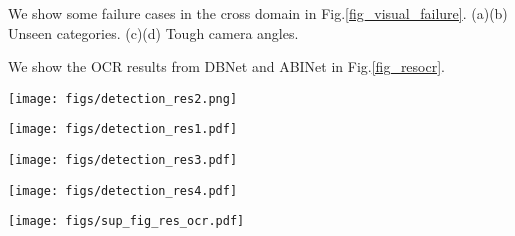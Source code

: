 \documentclass[runningheads]{llncs}
\begin{document}
We show some failure cases in the cross domain in  Fig.\ref{fig_visual_failure}. (a)(b) Unseen categories. (c)(d) Tough camera angles.

We show the OCR results from DBNet and ABINet in Fig.\ref{fig_resocr}.










\begin{figure*}[t]
\centering
\texttt{[image: figs/detection\_res2.png]}
\caption{Visualization of high difficulty detection result from the RetailDet.}
\label{fig_visual_det_hard}
\end{figure*}

\begin{figure*}[t]
\centering
\texttt{[image: figs/detection\_res1.pdf]}
\caption{Visualization of medium difficulty detection result from the RetailDet.}
\label{fig_visual_det_mid}
\end{figure*}

\begin{figure*}[t]
\centering
\texttt{[image: figs/detection\_res3.pdf]}
\caption{Visualization of low difficulty detection result from the RetailDet.}
\label{fig_visual_det_low}
\end{figure*}

\begin{figure*}[t]
\centering
\texttt{[image: figs/detection\_res4.pdf]}
\caption{Visualization of failure cases in cross domain. (a)(b) Unseen categories. (c)(d) Tough shooting angles.}
\label{fig_visual_failure}
\end{figure*}

\begin{figure*}[t]
\centering
\texttt{[image: figs/sup\_fig\_res\_ocr.pdf]}
\caption{Visualization of OCR results. Upper ones of each section are from models trained on ICDAR2015, and lower ones are on Unitail-OCR.}
\label{fig_resocr}
\end{figure*}
\end{document}
